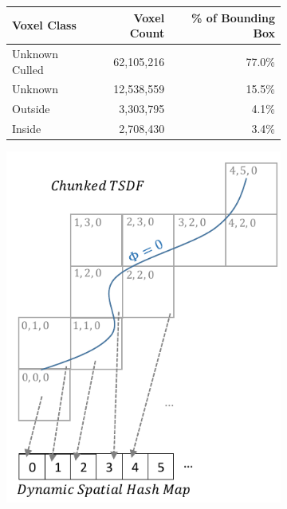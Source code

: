 \documentclass[conference]{IEEEtran}
\begin{document}
\begin{figure}
\begin{minipage} {0.25\linewidth}
\begin{subfigure}{1.0\linewidth}
		 \caption{} 
		 \label{fig:freiburg_2m}
	 \end{subfigure}  
	 \end{minipage}
    \begin{minipage}{0.45\linewidth}
		\begin{subfigure}{\linewidth} \footnotesize
		\begin{tabular} {| l | r | r |}
		\hline
		Voxel Class & Voxel Count & \% of Bounding Box \\ \hline
		Unknown Culled & 62,105,216 & 77.0\% \\ \hline
		Unknown & 12,538,559 & 15.5\% \\ \hline
		Outside & 3,303,795 & 4.1\% \\ \hline
		Inside & 2,708,430 & 3.4\% \\ \hline
		\end{tabular}
		\caption{}
		\label{table:volumecount}  
		\end{subfigure} 
 	  	\begin{subfigure}{0.45\linewidth} \centering
 	    \includegraphics[width=1.0\textwidth]{img/chunks.pdf}

\end{subfigure}
\end{minipage}
\end{figure}
\end{document}
